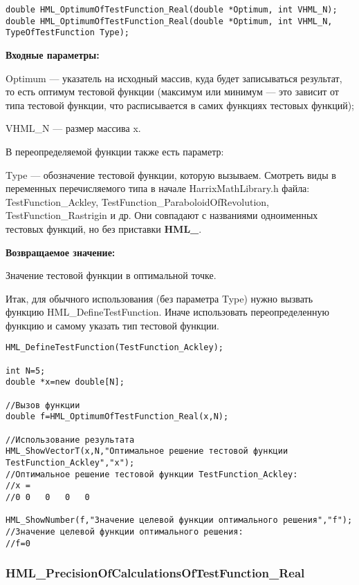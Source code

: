 \documentclass[a4paper,12pt]{article}
\begin{document}
\begin{lstlisting}[label=code_syntax_HML_OptimumOfTestFunction_Real,caption=Синтаксис]
double HML_OptimumOfTestFunction_Real(double *Optimum, int VHML_N);
double HML_OptimumOfTestFunction_Real(double *Optimum, int VHML_N, TypeOfTestFunction Type);
\end{lstlisting}

\textbf{Входные параметры:}

Optimum --- указатель на исходный массив, куда будет записываться результат, то есть оптимум тестовой функции (максимум или минимум --- это зависит от типа тестовой функции, что расписывается в самих функциях тестовых функций);

     VHML\_N --- размер массива x.

В переопределяемой функции также есть параметр:
  
Type --- обозначение тестовой функции, которую вызываем.
Смотреть виды в переменных перечисляемого типа в начале HarrixMathLibrary.h файла: TestFunction\_Ackley, TestFunction\_ParaboloidOfRevolution, TestFunction\_Rastrigin и др. Они совпадают с названиями одноименных тестовых функций, но без приставки \textbf{HML\_}.

\textbf{Возвращаемое значение:}
 
Значение тестовой функции в оптимальной точке.

Итак, для обычного использования (без параметра Type) нужно вызвать функцию HML\_DefineTestFunction. Иначе использовать переопределенную функцию и самому указать тип тестовой функции.


\begin{lstlisting}[label=code_use_HML_OptimumOfTestFunction_Real,caption=Пример использования]
HML_DefineTestFunction(TestFunction_Ackley);

int N=5;
double *x=new double[N];

//Вызов функции
double f=HML_OptimumOfTestFunction_Real(x,N);

//Использование результата
HML_ShowVectorT(x,N,"Оптимальное решение тестовой функции TestFunction_Ackley","x");
//Оптимальное решение тестовой функции TestFunction_Ackley:
//x =	
//0	0	0	0	0

HML_ShowNumber(f,"Значение целевой функции оптимального решения","f");
//Значение целевой функции оптимального решения:
//f=0
\end{lstlisting}

\subsubsection{HML\_PrecisionOfCalculationsOfTestFunction\_Real}\label{HML_PrecisionOfCalculationsOfTestFunction_Real}
\end{document}
